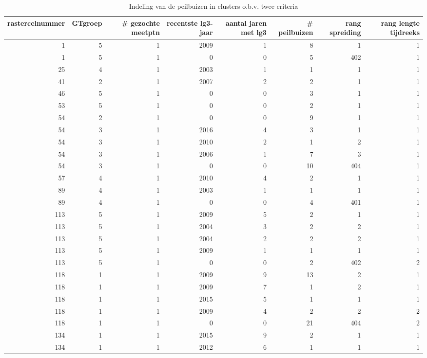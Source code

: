 \documentclass[11pt,]{book}
\begin{document}
\begin{table}

\caption{\label{tab:berekenen-clusters-criteria}Indeling van de peilbuizen in clusters o.b.v. twee criteria}
\centering
\begin{tabular}[t]{r|r|r|r|r|r|r|r}
\hline
rastercelnummer & GTgroep & \# gezochte meetptn & recentste lg3-jaar & aantal jaren met lg3 & \# peilbuizen & rang spreiding & rang lengte tijdreeks\\
\hline
1 & 5 & 1 & 2009 & 1 & 8 & 1 & 1\\
\hline
1 & 5 & 1 & 0 & 0 & 5 & 402 & 1\\
\hline
25 & 4 & 1 & 2003 & 1 & 1 & 1 & 1\\
\hline
41 & 2 & 1 & 2007 & 2 & 2 & 1 & 1\\
\hline
46 & 5 & 1 & 0 & 0 & 3 & 1 & 1\\
\hline
53 & 5 & 1 & 0 & 0 & 2 & 1 & 1\\
\hline
54 & 2 & 1 & 0 & 0 & 9 & 1 & 1\\
\hline
54 & 3 & 1 & 2016 & 4 & 3 & 1 & 1\\
\hline
54 & 3 & 1 & 2010 & 2 & 1 & 2 & 1\\
\hline
54 & 3 & 1 & 2006 & 1 & 7 & 3 & 1\\
\hline
54 & 3 & 1 & 0 & 0 & 10 & 404 & 1\\
\hline
57 & 4 & 1 & 2010 & 4 & 2 & 1 & 1\\
\hline
89 & 4 & 1 & 2003 & 1 & 1 & 1 & 1\\
\hline
89 & 4 & 1 & 0 & 0 & 4 & 401 & 1\\
\hline
113 & 5 & 1 & 2009 & 5 & 2 & 1 & 1\\
\hline
113 & 5 & 1 & 2004 & 3 & 2 & 2 & 1\\
\hline
113 & 5 & 1 & 2004 & 2 & 2 & 2 & 1\\
\hline
113 & 5 & 1 & 2009 & 1 & 1 & 1 & 1\\
\hline
113 & 5 & 1 & 0 & 0 & 2 & 402 & 2\\
\hline
118 & 1 & 1 & 2009 & 9 & 13 & 2 & 1\\
\hline
118 & 1 & 1 & 2009 & 7 & 1 & 2 & 1\\
\hline
118 & 1 & 1 & 2015 & 5 & 1 & 1 & 1\\
\hline
118 & 1 & 1 & 2009 & 4 & 2 & 2 & 2\\
\hline
118 & 1 & 1 & 0 & 0 & 21 & 404 & 2\\
\hline
134 & 1 & 1 & 2015 & 9 & 2 & 1 & 1\\
\hline
134 & 1 & 1 & 2012 & 6 & 1 & 1 & 1\\

\end{tabular}
\end{table}
\end{document}
